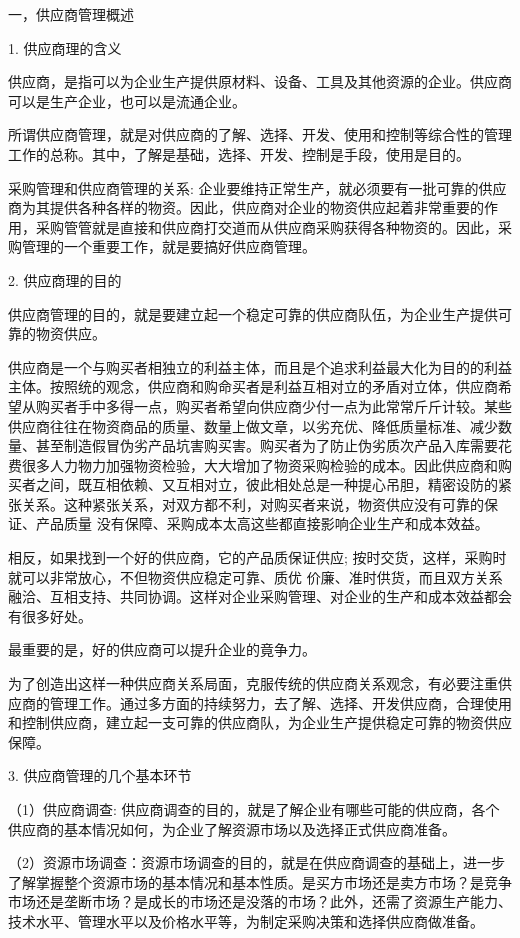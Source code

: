 一，供应商管理概述

    1. 供应商理的含义

    供应商，是指可以为企业生产提供原材料、设备、工具及其他资源的企业。供应商可以是生产企业，也可以是流通企业。

    所谓供应商管理，就是对供应商的了解、选择、开发、使用和控制等综合性的管理工作的总称。其中，了解是基础，选择、开发、控制是手段，使用是目的。

    采购管理和供应商管理的关系: 企业要维持正常生产，就必须要有一批可靠的供应商为其提供各种各样的物资。因此，供应商对企业的物资供应起着非常重要的作用，采购管管就是直接和供应商打交道而从供应商采购获得各种物资的。因此，采购管理的一个重要工作，就是要搞好供应商管理。

    2. 供应商理的目的

    供应商管理的目的，就是要建立起一个稳定可靠的供应商队伍，为企业生产提供可靠的物资供应。

    供应商是一个与购买者相独立的利益主体，而且是个追求利益最大化为目的的利益主体。按照统的观念，供应商和购命买者是利益互相对立的矛盾对立体，供应商希望从购买者手中多得一点，购买者希望向供应商少付一点为此常常斤斤计较。某些供应商往往在物资商品的质量、数量上做文章，以劣充优、降低质量标准、减少数量、甚至制造假冒伪劣产品坑害购买害。购买者为了防止伪劣质次产品入库需要花费很多人力物力加强物资检验，大大增加了物资采购检验的成本。因此供应商和购买者之间，既互相依赖、又互相对立，彼此相处总是一种提心吊胆，精密设防的紧张关系。这种紧张关系，对双方都不利，对购买者来说，物资供应没有可靠的保证、产品质量
没有保障、采购成本太高这些都直接影响企业生产和成本效益。

    相反，如果找到一个好的供应商，它的产品质保证供应; 按时交货，这样，采购时就可以非常放心，不但物资供应稳定可靠、质优
价廉、准时供货，而且双方关系融洽、互相支持、共同协调。这样对企业采购管理、对企业的生产和成本效益都会有很多好处。

    最重要的是，好的供应商可以提升企业的竟争力。

    为了创造出这样一种供应商关系局面，克服传统的供应商关系观念，有必要注重供应商的管理工作。通过多方面的持续努力，去了解、选择、开发供应商，合理使用和控制供应商，建立起一支可靠的供应商队，为企业生产提供稳定可靠的物资供应保障。

    3. 供应商管理的几个基本环节

    （1）供应商调查: 供应商调查的目的，就是了解企业有哪些可能的供应商，各个供应商的基本情况如何，为企业了解资源市场以及选择正式供应商准备。

    （2）资源市场调查：资源市场调查的目的，就是在供应商调查的基础上，进一步了解掌握整个资源市场的基本情况和基本性质。是买方市场还是卖方市场？是竞争市场还是垄断市场？是成长的市场还是没落的市场？此外，还需了资源生产能力、技术水平、管理水平以及价格水平等，为制定采购决策和选择供应商做准备。

